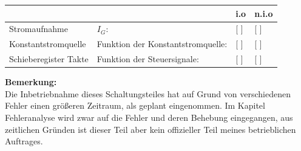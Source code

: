 \documentclass[a4paper,11pt]{scrartcl}
\begin{document}

\renewcommand{\arraystretch}{2}
\begin{tabularx}{\textwidth}{p{}| p{} | p{} | p{}}

 &  & i.o & n.i.o \\

\hline

Stromaufnahme & $I_{G}$: & [ ] & [ ] \\

\hline

Konstantstromquelle & Funktion der Konstantstromquelle: 	& [ ] & [ ] \\

\hline

Schieberegister Takte & Funktion der Steuersignale: 		& [ ] & [ ] \\
		
\end{tabularx}
\renewcommand{\arraystretch}{1}


\vspace{1,5cm}
\textbf{Bemerkung:}
\\
Die Inbetriebnahme dieses Schaltungsteiles hat auf Grund von verschiedenen Fehler einen größeren Zeitraum, als geplant eingenommen. Im Kapitel Fehleranalyse wird zwar auf die Fehler und deren Behebung eingegangen, aus zeitlichen Gründen ist dieser Teil aber kein offizieller Teil meines betrieblichen Auftrages.
\end{document}
